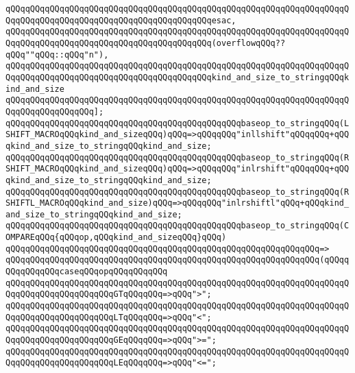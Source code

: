 \verb|qQQqqQQqqQQqqQQqqQQqqQQqqQQqqQQqqQQqqQQqqQQqqQQqqQQqqQQqqQQqqQQqqQQqqQQqqQQqqQQqqQQqqQQqqQQqqQQqqQQqqQQqqQQqqQQqesac,|\newline
\newline
\verb|qQQqqQQqqQQqqQQqqQQqqQQqqQQqqQQqqQQqqQQqqQQqqQQqqQQqqQQqqQQqqQQqqQQqqQQqqQQqqQQqqQQqqQQqqQQqqQQqqQQqqQQqqQQqqQQq(overflowqQQq??qQQq""qQQq::qQQq"n"),|\newline
\newline
\verb|qQQqqQQqqQQqqQQqqQQqqQQqqQQqqQQqqQQqqQQqqQQqqQQqqQQqqQQqqQQqqQQqqQQqqQQqqQQqqQQqqQQqqQQqqQQqqQQqqQQqqQQqqQQqqQQqkind_and_size_to_stringqQQqkind_and_size|\newline
\verb|qQQqqQQqqQQqqQQqqQQqqQQqqQQqqQQqqQQqqQQqqQQqqQQqqQQqqQQqqQQqqQQqqQQqqQQqqQQqqQQqqQQqqQQq];|\newline
\newline
\verb|qQQqqQQqqQQqqQQqqQQqqQQqqQQqqQQqqQQqqQQqqQQqqQQqbaseop_to_stringqQQq(LSHIFT_MACROqQQqkind_and_sizeqQQq)qQQq=>qQQqqQQq"inllshift"qQQqqQQq+qQQqkind_and_size_to_stringqQQqkind_and_size;|\newline
\verb|qQQqqQQqqQQqqQQqqQQqqQQqqQQqqQQqqQQqqQQqqQQqqQQqbaseop_to_stringqQQq(RSHIFT_MACROqQQqkind_and_sizeqQQq)qQQq=>qQQqqQQq"inlrshift"qQQqqQQq+qQQqkind_and_size_to_stringqQQqkind_and_size;|\newline
\verb|qQQqqQQqqQQqqQQqqQQqqQQqqQQqqQQqqQQqqQQqqQQqqQQqbaseop_to_stringqQQq(RSHIFTL_MACROqQQqkind_and_size)qQQq=>qQQqqQQq"inlrshiftl"qQQq+qQQqkind_and_size_to_stringqQQqkind_and_size;|\newline
\newline
\verb|qQQqqQQqqQQqqQQqqQQqqQQqqQQqqQQqqQQqqQQqqQQqqQQqbaseop_to_stringqQQq(COMPAREqQQq{qQQqop,qQQqkind_and_sizeqQQq}qQQq)|\newline
\verb|qQQqqQQqqQQqqQQqqQQqqQQqqQQqqQQqqQQqqQQqqQQqqQQqqQQqqQQqqQQqqQQq=>|\newline
\verb|qQQqqQQqqQQqqQQqqQQqqQQqqQQqqQQqqQQqqQQqqQQqqQQqqQQqqQQqqQQqqQQq(qQQqqQQqqQQqqQQqcaseqQQqopqQQqqQQqqQQq|\newline
\verb|qQQqqQQqqQQqqQQqqQQqqQQqqQQqqQQqqQQqqQQqqQQqqQQqqQQqqQQqqQQqqQQqqQQqqQQqqQQqqQQqqQQqqQQqqQQqGTqQQqqQQq=>qQQq">";|\newline
\verb|qQQqqQQqqQQqqQQqqQQqqQQqqQQqqQQqqQQqqQQqqQQqqQQqqQQqqQQqqQQqqQQqqQQqqQQqqQQqqQQqqQQqqQQqqQQqLTqQQqqQQq=>qQQq"<";|\newline
\verb|qQQqqQQqqQQqqQQqqQQqqQQqqQQqqQQqqQQqqQQqqQQqqQQqqQQqqQQqqQQqqQQqqQQqqQQqqQQqqQQqqQQqqQQqqQQqGEqQQqqQQq=>qQQq">=";|\newline
\verb|qQQqqQQqqQQqqQQqqQQqqQQqqQQqqQQqqQQqqQQqqQQqqQQqqQQqqQQqqQQqqQQqqQQqqQQqqQQqqQQqqQQqqQQqqQQqLEqQQqqQQq=>qQQq"<=";|\newline
